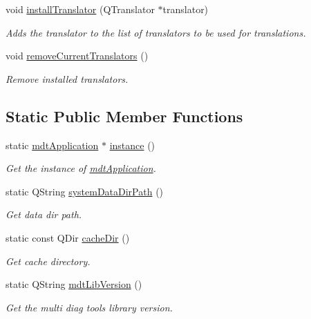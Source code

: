 \begin{DoxyCompactItemize}
void \hyperlink{classmdt_application_af4ff7f4cbb1c93a35f06ea197e3dde42}{installTranslator} (QTranslator $\ast$translator)
\begin{DoxyCompactList}\small\item\em Adds the translator to the list of translators to be used for translations. \end{DoxyCompactList}\item 
void \hyperlink{classmdt_application_ae83acc410a132b9972d6e961e0c79b0d}{removeCurrentTranslators} ()
\begin{DoxyCompactList}\small\item\em Remove installed translators. \end{DoxyCompactList}\end{DoxyCompactItemize}
\subsection*{Static Public Member Functions}
\begin{DoxyCompactItemize}
\item 
static \hyperlink{classmdt_application}{mdtApplication} $\ast$ \hyperlink{classmdt_application_a365ac79934070b0e5a42d2c7cd9b076d}{instance} ()
\begin{DoxyCompactList}\small\item\em Get the instance of \hyperlink{classmdt_application}{mdtApplication}. \end{DoxyCompactList}\item 
static QString \hyperlink{classmdt_application_af17bb16e420c91af3d0ad1970714388c}{systemDataDirPath} ()
\begin{DoxyCompactList}\small\item\em Get data dir path. \end{DoxyCompactList}\item 
\hypertarget{classmdt_application_a936beeeb6d56d5d669a478f248d80c7d}{
static const QDir \hyperlink{classmdt_application_a936beeeb6d56d5d669a478f248d80c7d}{cacheDir} ()}
\label{classmdt_application_a936beeeb6d56d5d669a478f248d80c7d}

\begin{DoxyCompactList}\small\item\em Get cache directory. \end{DoxyCompactList}\item 
\hypertarget{classmdt_application_ad5318086812dad2c2870e294703caa51}{
static QString \hyperlink{classmdt_application_ad5318086812dad2c2870e294703caa51}{mdtLibVersion} ()}
\label{classmdt_application_ad5318086812dad2c2870e294703caa51}

\begin{DoxyCompactList}\small\item\em Get the multi diag tools library version. \end{DoxyCompactList}\end{DoxyCompactItemize}


